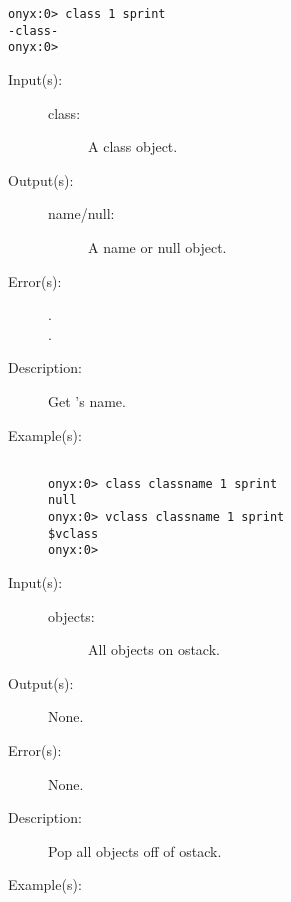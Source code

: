 \begin{description}
\begin{description}
\begin{verbatim}
onyx:0> class 1 sprint
-class-
onyx:0>
		\end{verbatim}
	\end{description}
\label{systemdict:classname}
\item[{\onyxop{class}{classname}{--}}: ]
	\begin{description}\item[]
	\item[Input(s): ]
		\begin{description}\item[]
		\item[class: ]
			A class object.
		\end{description}
	\item[Output(s): ]
		\begin{description}\item[]
		\item[name/null: ]
			A name or null object.
		\end{description}
	\item[Error(s): ]
		\begin{description}\item[]
		\item[.]
		\item[.]
		\end{description}
	\item[Description: ]
		Get 's name.
	\item[Example(s): ]\begin{verbatim}

onyx:0> class classname 1 sprint
null
onyx:0> vclass classname 1 sprint
$vclass
onyx:0>
		\end{verbatim}
	\end{description}
\label{systemdict:clear}
\item[{\onyxop{objects}{clear}{--}}: ]
	\begin{description}\item[]
	\item[Input(s): ]
		\begin{description}\item[]
		\item[objects: ]
			All objects on ostack.
		\end{description}
	\item[Output(s): ] None.
	\item[Error(s): ] None.
	\item[Description: ]
		Pop all objects off of ostack.
	\item[Example(s): ]\begin{verbatim}


\end{verbatim}
\end{description}
\end{description}
